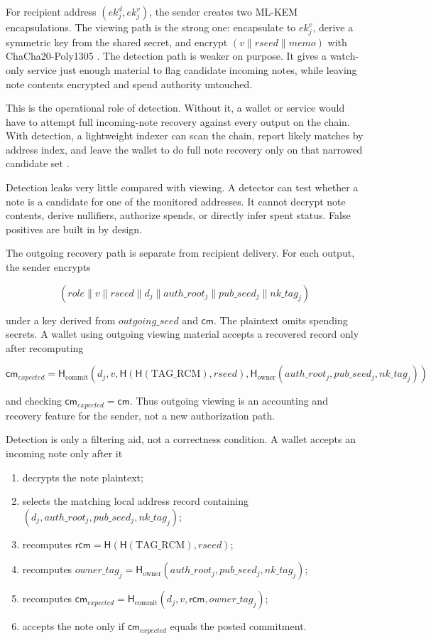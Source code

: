\documentclass[11pt]{article}
\newcommand{\Hash}{\mathsf{H}}
\newcommand{\cm}{\mathsf{cm}}
\newcommand{\rcm}{\mathsf{rcm}}
\begin{document}
For recipient address \((ek^d_j, ek^v_j)\), the sender creates two ML-KEM
encapsulations. The viewing path is the strong one: encapsulate to \(ek^v_j\),
derive a symmetric key from the shared secret, and encrypt
\((v \parallel rseed \parallel memo)\) with ChaCha20-Poly1305
\cite{nist-fips203,kyber,chacha-rfc}. The detection path is weaker on purpose.
It gives a watch-only service just enough material to flag candidate incoming
notes, while leaving note contents encrypted and spend authority untouched.

This is the operational role of detection. Without it, a wallet or service would
have to attempt full incoming-note recovery against every output on the chain.
With detection, a lightweight indexer can scan the chain, report likely
matches by address index, and leave the wallet to do full note recovery only on
that narrowed candidate set \cite{fmd}.

Detection leaks very little compared with viewing. A detector can test whether a
note is a candidate for one of the monitored addresses. It cannot decrypt note
contents, derive nullifiers, authorize spends, or directly infer spent status.
False positives are built in by design.

The outgoing recovery path is separate from recipient delivery. For each output,
the sender encrypts

\[
(role \parallel v \parallel rseed \parallel d_j \parallel auth\_root_j
 \parallel pub\_seed_j \parallel nk\_tag_j)
\]

under a key derived from \(outgoing\_seed\) and \(\cm\). The plaintext omits
spending secrets. A wallet using outgoing viewing material accepts a recovered
record only after recomputing

\[
\cm_{expected} =
\Hash_{\mathrm{commit}}(d_j, v, \Hash(\Hash(\mathrm{TAG\_RCM}), rseed),
\Hash_{\mathrm{owner}}(auth\_root_j, pub\_seed_j, nk\_tag_j))
\]

and checking \(\cm_{expected} = \cm\). Thus outgoing viewing is an accounting
and recovery feature for the sender, not a new authorization path.

Detection is only a filtering aid, not a correctness condition. A wallet accepts
an incoming note only after it

\begin{enumerate}
  \item decrypts the note plaintext;
  \item selects the matching local address record containing
        \((d_j, auth\_root_j, pub\_seed_j, nk\_tag_j)\);
  \item recomputes \(\rcm = \Hash(\Hash(\mathrm{TAG\_RCM}), rseed)\);
  \item recomputes
        \(owner\_tag_j = \Hash_{\mathrm{owner}}(auth\_root_j, pub\_seed_j, nk\_tag_j)\);
  \item recomputes
        \(\cm_{expected} = \Hash_{\mathrm{commit}}(d_j, v, \rcm, owner\_tag_j)\);
  \item accepts the note only if \(\cm_{expected}\) equals the posted
        commitment.
\end{enumerate}
\end{document}
